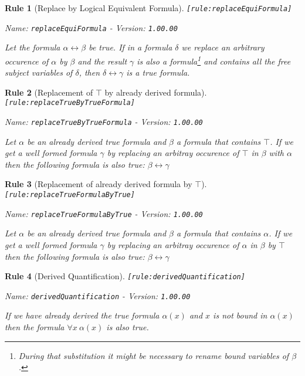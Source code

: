 \documentclass[a4paper,german,10pt,twoside]{book}
\newtheorem{rul}{Rule}
\theoremstyle{definition}
\theoremstyle{remark}
\begin{document}
\begin{rul}[Replace by Logical Equivalent Formula]
\label{rule:replaceEquiFormula} \hypertarget{rule:replaceEquiFormula}{}
{\tt \tiny [\verb]rule:replaceEquiFormula]]}

\par
{\em   Name: \verb]replaceEquiFormula]  -  Version: \verb]1.00.00]}


Let the formula $\alpha \leftrightarrow \beta$ be true. If in a formula $\delta$ we replace an arbitrary occurence of $\alpha$ by $\beta$ and the result $\gamma$ is also a formula\footnote{During that substitution it might be necessary to rename bound variables of $\beta$.} and contains all the free subject variables of $\delta$, then $\delta \leftrightarrow \gamma$ is a true formula.
\end{rul}


\begin{rul}[Replacement of $\top$ by already derived formula]
\label{rule:replaceTrueByTrueFormula} \hypertarget{rule:replaceTrueByTrueFormula}{}
{\tt \tiny [\verb]rule:replaceTrueByTrueFormula]]}

\par
{\em   Name: \verb]replaceTrueByTrueFormula]  -  Version: \verb]1.00.00]}


Let $\alpha$ be an already derived true formula and $\beta$ a formula that contains $\top$. If we get a well formed formula $\gamma$ by replacing an arbitray occurence of $\top$ in $\beta$ with $\alpha$ then the following formula is also true: $\beta \leftrightarrow \gamma$
\end{rul}


\begin{rul}[Replacement of already derived formula by $\top$]
\label{rule:replaceTrueFormulaByTrue} \hypertarget{rule:replaceTrueFormulaByTrue}{}
{\tt \tiny [\verb]rule:replaceTrueFormulaByTrue]]}

\par
{\em   Name: \verb]replaceTrueFormulaByTrue]  -  Version: \verb]1.00.00]}


Let $\alpha$ be an already derived true formula and $\beta$ a formula that contains $\alpha$. If we get a well formed formula $\gamma$ by replacing an arbitray occurence of $\alpha$ in $\beta$ by $\top$ then the following formula is also true: $\beta \leftrightarrow \gamma$
\end{rul}


\begin{rul}[Derived Quantification]
\label{rule:derivedQuantification} \hypertarget{rule:derivedQuantification}{}
{\tt \tiny [\verb]rule:derivedQuantification]]}

\par
{\em   Name: \verb]derivedQuantification]  -  Version: \verb]1.00.00]}


If we have already derived the true formula $\alpha(x)$ and $x$ is not bound in $\alpha(x)$ then the formula $\forall x \ \alpha(x)$ is also true.
\end{rul}
\end{document}
